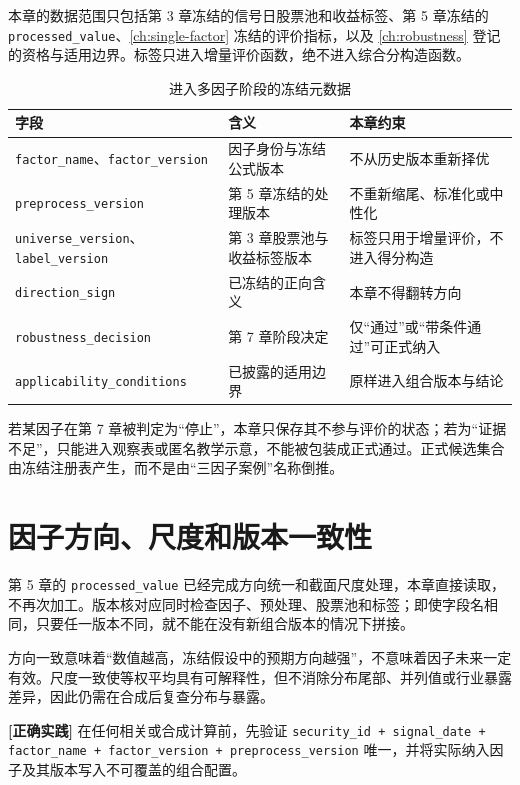 本章的数据范围只包括第 3 章冻结的信号日股票池和收益标签、第 5 章冻结的 \texttt{processed\_value}、\cref{ch:single-factor} 冻结的评价指标，以及 \cref{ch:robustness} 登记的资格与适用边界。标签只进入增量评价函数，绝不进入综合分构造函数。

\begin{table}[htbp]
  \centering
  \small
  \caption{进入多因子阶段的冻结元数据}
  \label{tab:ch08-frozen-registry}
  \begin{tabularx}{\textwidth}{p{3.6cm} Y Y}
    \toprule
    字段 & 含义 & 本章约束 \\
    \midrule
    \texttt{factor\_name}、\texttt{factor\_version} & 因子身份与冻结公式版本 & 不从历史版本重新择优 \\
    \texttt{preprocess\_version} & 第 5 章冻结的处理版本 & 不重新缩尾、标准化或中性化 \\
    \texttt{universe\_version}、\texttt{label\_version} & 第 3 章股票池与收益标签版本 & 标签只用于增量评价，不进入得分构造 \\
    \texttt{direction\_sign} & 已冻结的正向含义 & 本章不得翻转方向 \\
    \texttt{robustness\_decision} & 第 7 章阶段决定 & 仅“通过”或“带条件通过”可正式纳入 \\
    \texttt{applicability\_conditions} & 已披露的适用边界 & 原样进入组合版本与结论 \\
    \bottomrule
  \end{tabularx}
\end{table}

若某因子在第 7 章被判定为“停止”，本章只保存其不参与评价的状态；若为“证据不足”，只能进入观察表或匿名教学示意，不能被包装成正式通过。正式候选集合由冻结注册表产生，而不是由“三因子案例”名称倒推。

\section{因子方向、尺度和版本一致性}

第 5 章的 \texttt{processed\_value} 已经完成方向统一和截面尺度处理，本章直接读取，不再次加工。版本核对应同时检查因子、预处理、股票池和标签；即使字段名相同，只要任一版本不同，就不能在没有新组合版本的情况下拼接。

方向一致意味着“数值越高，冻结假设中的预期方向越强”，不意味着因子未来一定有效。尺度一致使等权平均具有可解释性，但不消除分布尾部、并列值或行业暴露差异，因此仍需在合成后复查分布与暴露。

\begin{practicebox}
\textbf{[正确实践]} 在任何相关或合成计算前，先验证 \texttt{security\_id + signal\_date + factor\_name + factor\_version + preprocess\_version} 唯一，并将实际纳入因子及其版本写入不可覆盖的组合配置。
\end{practicebox}

